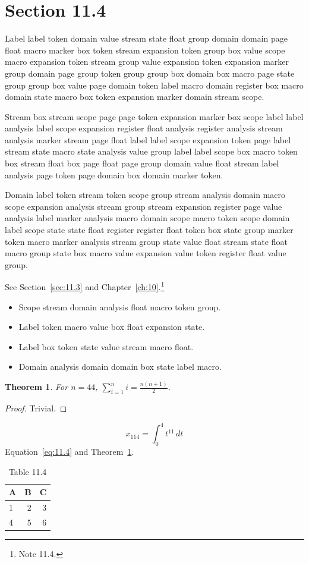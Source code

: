 \documentclass[11pt,twoside]{book}
\newtheorem{theorem}{Theorem}[chapter]
\begin{document}
\section{Section 11.4}\label{sec:11.4}
Label label token domain value stream state float group domain domain page float macro marker box token stream expansion token group box value scope macro expansion token stream group value expansion token expansion marker group domain page group token group group box domain box macro page state group group box value page domain token label macro domain register box macro domain state macro box token expansion marker domain stream scope.

Stream box stream scope page page token expansion marker box scope label label analysis label scope expansion register float analysis register analysis stream analysis marker stream page float label label scope expansion token page label stream state macro state analysis value group label label scope box macro token box stream float box page float page group domain value float stream label analysis page token page domain box domain marker token.

Domain label token stream token scope group stream analysis domain macro scope expansion analysis stream group stream expansion register page value analysis label marker analysis macro domain scope macro token scope domain label scope state state float register register float token box state group marker token macro marker analysis stream group state value float stream state float macro group state box macro value expansion value token register float value group.

See Section~\ref{sec:11.3} and Chapter~\ref{ch:10}.\footnote{Note 11.4.}
\begin{itemize}\item Scope stream domain analysis float macro token group.\item Label token macro value box float expansion state.\item Label box token state value stream macro float.\item Domain analysis domain domain box state label macro.\end{itemize}
\begin{theorem}\label{thm:11.4}For $n=44$, $\sum_{i=1}^{n}i=\frac{n(n+1)}{2}$.\end{theorem}\begin{proof}Trivial.\end{proof}
\begin{equation}x_{114}=\int_0^{4}t^{11}\,dt\label{eq:11.4}\end{equation} Equation~\eqref{eq:11.4} and Theorem~\ref{thm:11.4}.
\begin{table}[ht]\centering\caption{Table 11.4}\begin{tabular}{lrr}\toprule A&B&C\\\midrule 1&2&3\\ 4&5&6\\\bottomrule\end{tabular}\end{table}
\end{document}
